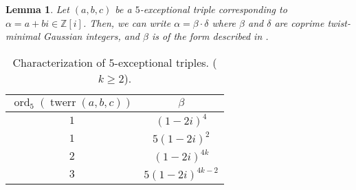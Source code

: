 \documentclass[12pt]{amsart}
\newcounter{counter}[section] %
\numberwithin{equation}{section} %
\newtheorem{lemma}[counter]{Lemma}
\theoremstyle{definition} \newtheorem{definition}[counter]{Definition}
\theoremstyle{remark} \newtheorem{nonexam}[counter]{Non-example}
\newcommand{\ZZ}{\mathbb{Z}} %
\DeclareMathOperator{\ord}{ord} %
\DeclareMathOperator{\twerr}{twerr} %
\begin{document}
\begin{lemma}
  Let $(a,b,c)$ be a $5$-exceptional triple corresponding to
  $\alpha = a+bi \in \ZZ[i]$. Then, we can write $\alpha = \beta\cdot\delta$
  where $\beta$ and $\delta$ are coprime twist-minimal Gaussian integers, and
  $\beta$ is of the form described in
  .
\end{lemma}
\begin{table}[ht]
    \begin{tabular}{|c|c|}
      \hline
      $\ord_5(\twerr(a,b,c))$ & $\beta$               \\ \hline
      $1$   & $(1 - 2i)^4$                            \\ \hline
      $1$   & $5(1 - 2i)^2$                           \\ \hline
      $2$   & $(1 - 2i)^{4k}$                         \\ \hline
      $3$   & $5(1 - 2i)^{4k-2}$                      \\ \hline
    \end{tabular}
    \caption{Characterization of $5$-exceptional triples. ($k \geq 2$). }
    \label{table:characterization-5-exceptional-triples}
\end{table}
\end{document}
